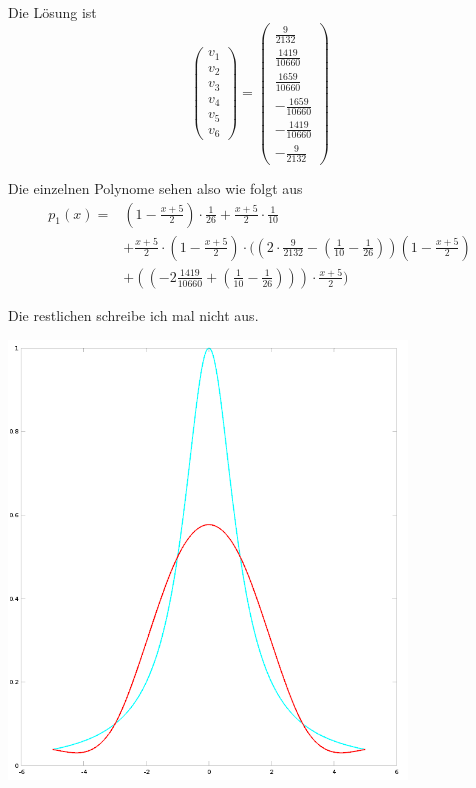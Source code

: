 \documentclass[10pt,a4paper]{article}
\begin{document}
Die Lösung ist
\begin{equation}
  \begin{pmatrix}
    v_{1}\\
    v_{2}\\
    v_{3}\\
    v_{4}\\
    v_{5}\\
    v_{6}
  \end{pmatrix}
  =
  \begin{pmatrix}
    \frac{9}{2132}\\
    \frac{1419}{10660}\\
    \frac{1659}{10660}\\
    -\frac{1659}{10660}\\
    -\frac{1419}{10660}\\
    -\frac{9}{2132}
  \end{pmatrix}
\end{equation}

Die einzelnen Polynome sehen also wie folgt aus
\begin{align*}
  p_{1}(x) = & (1 - \frac{x + 5}{2}) \cdot \frac{1}{26} + \frac{x + 5}{2} \cdot \frac{1}{10}\\
  & + \frac{x + 5}{2} \cdot (1 - \frac{x + 5}{2}) \cdot ((2 \cdot \frac{9}{2132} - (\frac{1}{10} - \frac{1}{26})) (1 - \frac{x + 5}{2})\\
  & + ((-2\frac{1419}{10660} + (\frac{1}{10} - \frac{1}{26}))) \cdot \frac{x + 5}{2})
\end{align*}

Die restlichen schreibe ich mal nicht aus.

\includegraphics[width=300pt]{4_13.png}
\end{document}
